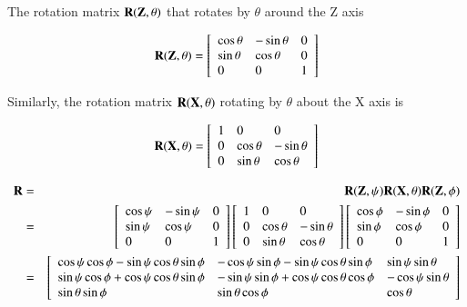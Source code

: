 The rotation matrix $\mathbf{R}(\mathbf{Z},\theta)$ that rotates by $\theta$ around the Z axis

\begin{eqnarray}
\mathbf{R}(\mathbf{Z},\theta) =
\left[\begin{array}{lll}
\cos\theta & -\sin\theta & 0\\
\sin\theta & \cos\theta & 0 \\
0 & 0 & 1
\end{array}\right]
\end{eqnarray}

Similarly, the rotation matrix $\mathbf{R}(\mathbf{X},\theta)$ rotating by $\theta$ about the X axis is

\begin{eqnarray}
\mathbf{R}(\mathbf{X},\theta) =
\left[\begin{array}{lll}
1 & 0 & 0 \\
0 & \cos\theta & -\sin\theta\\
0 & \sin\theta & \cos\theta
\end{array}\right]
\end{eqnarray}


\begin{eqnarray}
\mathbf{R}
&=&
\mathbf{R}(\mathbf{Z},\psi)\mathbf{R}(\mathbf{X},\theta)\mathbf{R}(\mathbf{Z},\phi)\\
&=&
\left[\begin{array}{lll}
\cos\psi & -\sin\psi & 0\\
\sin\psi & \cos\psi & 0 \\
0 & 0 & 1
\end{array}\right]
\left[\begin{array}{lll}
1 & 0 & 0 \\
0 & \cos\theta & -\sin\theta\\
0 & \sin\theta & \cos\theta
\end{array}\right]
\left[\begin{array}{lll}
\cos\phi & -\sin\phi & 0\\
\sin\phi & \cos\phi & 0 \\
0 & 0 & 1
\end{array}\right]\\
&=&
\left[\begin{array}{lll}
\cos\psi\cos\phi-\sin\psi\cos\theta\sin\phi & -\cos\psi\sin\phi - \sin\psi\cos\theta\sin\phi & \sin\psi\sin\theta\\
\sin\psi\cos\phi+\cos\psi\cos\theta\sin\phi & -\sin\psi\sin\phi+\cos\psi\cos\theta\cos\phi & -\cos\psi\sin\theta\\
\sin\theta\sin\phi & \sin\theta\cos\phi & \cos\theta
\end{array}\right]
\end{eqnarray}



